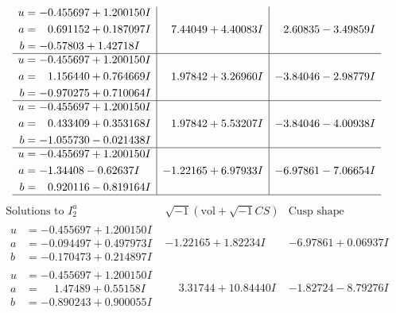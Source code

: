 \documentclass[1p]{elsarticle_modified}
\theoremstyle{definition}
\newcommand{\I}{\sqrt{-1}}
\begin{document}
$$\begin{array}{c|c|c}
\begin{aligned}
u &= -0.455697 + 1.200150 I \\
a &= \phantom{-}0.691152 + 0.187097 I \\
b &= -0.57803 + 1.42718 I\end{aligned}
 & \phantom{-}7.44049 + 4.40083 I & \phantom{-}2.60835 - 3.49859 I \\ \hline\begin{aligned}
u &= -0.455697 + 1.200150 I \\
a &= \phantom{-}1.156440 + 0.764669 I \\
b &= -0.970275 + 0.710064 I\end{aligned}
 & \phantom{-}1.97842 + 3.26960 I & -3.84046 - 2.98779 I \\ \hline\begin{aligned}
u &= -0.455697 + 1.200150 I \\
a &= \phantom{-}0.433409 + 0.353168 I \\
b &= -1.055730 - 0.021438 I\end{aligned}
 & \phantom{-}1.97842 + 5.53207 I & -3.84046 - 4.00938 I \\ \hline\begin{aligned}
u &= -0.455697 + 1.200150 I \\
a &= -1.34408 - 0.62637 I \\
b &= \phantom{-}0.920116 - 0.819164 I\end{aligned}
 & -1.22165 + 6.97933 I & -6.97861 - 7.06654 I\\
 \hline 
 \end{array}$$\newpage$$\begin{array}{c|c|c}  
\text{Solutions to }I^u_{2}& \I (\text{vol} + \sqrt{-1}CS) & \text{Cusp shape}\\
 \hline 
\begin{aligned}
u &= -0.455697 + 1.200150 I \\
a &= -0.094497 + 0.497973 I \\
b &= -0.170473 + 0.214897 I\end{aligned}
 & -1.22165 + 1.82234 I & -6.97861 + 0.06937 I \\ \hline\begin{aligned}
u &= -0.455697 + 1.200150 I \\
a &= \phantom{-}1.47489 + 0.55158 I \\
b &= -0.890243 + 0.900055 I\end{aligned}
 & \phantom{-}3.31744 + 10.84440 I & -1.82724 - 8.79276 I \\ \hline\begin{aligned}

\end{aligned}
\end{array}$$
\end{document}
